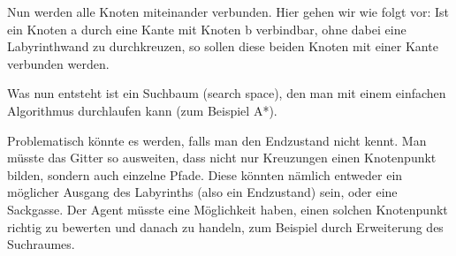 \documentclass[a4paper,11pt]{article}
\begin{document}
\begin{enumerate}
    Nun werden alle Knoten miteinander verbunden. Hier gehen wir wie folgt vor:
    Ist ein Knoten a durch eine Kante mit Knoten b verbindbar, ohne dabei eine Labyrinthwand zu durchkreuzen, so sollen diese beiden Knoten mit einer Kante verbunden werden.

    Was nun entsteht ist ein Suchbaum (search space), den man mit einem einfachen Algorithmus durchlaufen kann (zum Beispiel A*).

    Problematisch könnte es werden, falls man den Endzustand nicht kennt.
    Man müsste das Gitter so ausweiten, dass nicht nur Kreuzungen einen Knotenpunkt bilden, sondern auch einzelne Pfade. 
    Diese könnten nämlich entweder ein möglicher Ausgang des Labyrinths (also ein Endzustand) sein, oder eine Sackgasse.
    Der Agent müsste eine Möglichkeit haben, einen solchen Knotenpunkt richtig zu bewerten und danach zu handeln, zum Beispiel durch Erweiterung des Suchraumes.

    
\end{enumerate}
\end{document}
